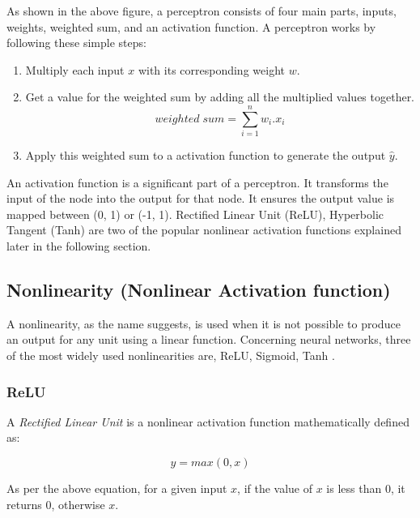 As shown in the above figure, a perceptron consists of four main parts, inputs, weights, weighted sum, and an activation function. A perceptron works by following these simple steps:

\begin{enumerate}
    \item Multiply each input $x$ with its corresponding weight $w$.
    \item Get a value for the weighted sum by adding all the multiplied values together.
        \begin{equation}
        \label{eqn:weighted_sum}
            weighted\; sum = \sum_{i=1}^{n}w_i.x_i
        \end{equation}
    \item Apply this weighted sum to a activation function to generate the output $\hat{y}$.
\end{enumerate}

An activation function is a significant part of a perceptron. It transforms the input of the node into the output for that node. It ensures the output value is mapped between (0, 1) or (-1, 1). Rectified Linear Unit (ReLU), Hyperbolic Tangent (Tanh) are two of the popular nonlinear activation functions explained later in the following section.

\subsection{Nonlinearity (Nonlinear Activation function)}\label{subsection:nonlinearity}

A nonlinearity, as the name suggests, is used when it is not possible to produce an output for any unit using a linear function. Concerning neural networks, three of the most widely used nonlinearities are, ReLU, Sigmoid, Tanh \cite{nonlin}.

\subsubsection{ReLU}\label{subsubsection:relu}

A \textit{Rectified Linear Unit} is a nonlinear activation function mathematically defined as:

\begin{equation}
    \label{eqn:relu}
    y = max(0, x)
\end{equation}

As per the above equation, for a given input $x$, if the value of $x$ is less than $0$, it returns $0$, otherwise $x$.

